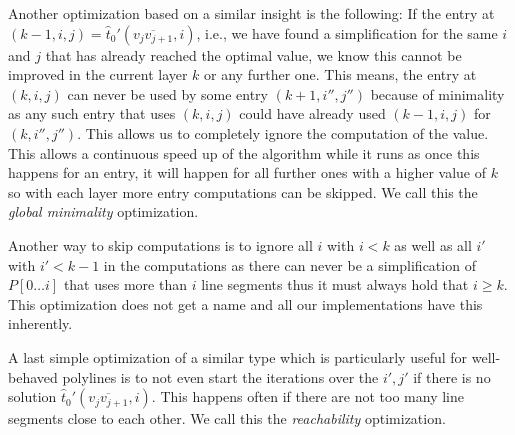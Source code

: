 Another optimization based on a similar insight is the following: If the entry at \((k-1, i, j) = \hat t_0'(\overline{v_{j}v_{j+1}}, i)\), i.e., we have found a simplification for the same \(i\) and \(j\) that has already reached the optimal value, we know this cannot be improved in the current layer \(k\) or any further one. This means, the entry at \((k, i, j)\) can never be used by some entry \((k + 1, i'', j'')\) because of minimality as any such entry that uses \((k, i, j)\) could have already used \((k-1, i, j)\) for \((k, i'', j'')\). This allows us to completely ignore the computation of the value. This allows a continuous speed up of the algorithm while it runs as once this happens for an entry, it will happen for all further ones with a higher value of \(k\) so with each layer more entry computations can be skipped. We call this the \emph{global minimality} optimization.

Another way to skip computations is to ignore all \(i\) with \(i < k\) as well as all \(i'\) with \(i' < k - 1\) in the computations as there can never be a simplification of \(P[0\dots i]\) that uses more than \(i\) line segments thus it must always hold that \(i \geq k\). This optimization does not get a name and all our implementations have this inherently.

A last simple optimization of a similar type which is particularly useful for well-behaved polylines is to not even start the iterations over the \(i', j'\) if there is no solution \(\hat t_0'(\overline{v_{j}v_{j+1}}, i)\). This happens often if there are not too many line segments close to each other. We call this the \emph{reachability} optimization. 



